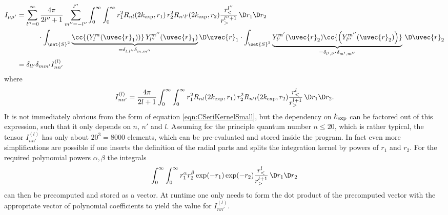 \begin{equation}
\begin{aligned}
	I_{\mu\mu'}
	&= \sum_{l''=0}^{\infty}\frac{4\pi}{2l''+1}
	\sum_{m''=-l''}^{l''}
	\int_0^\infty \int_0^\infty
	r_1^2 R_{nl}(2\kexp,r_1) \, r_2^2 R_{n'l'}(2\kexp,r_2) \frac{r^{l''}_<}{r_>^{l'' + 1}}
	\, \D r_1  \D r_2 \\
	&\hspace{30pt}
	\cdot \int_{\set{S}^2}
		\underbrace{\cc{\left(Y_l^m(\uvec{r}_1)\right)} \, Y_{l''}^{m''}(\uvec{r}_1)}
		_{=\delta_{l,l''}\delta_{m,m''}}
		\D \uvec{r}_1
	\cdot \int_{\set{S}^2}
		\underbrace{Y_{l'}^{m'}(\uvec{r}_2) \cc{\left(Y_{l''}^{m''}(\uvec{r}_2)\right)}}
		_{=\delta_{l',l''}\delta_{m',m''}}
		\, \D \uvec{r}_2 \\
	&= \delta_{ll'} \delta_{mm'} I^{(l)}_{nn'}
\end{aligned}
\label{eqn:CSeriKernel}
\end{equation}
where
\begin{equation}
	I^{(l)}_{nn'}
	= \frac{4\pi}{2l+1}
	\int_0^\infty \int_0^\infty
	r_1^2 R_{nl}(2\kexp,r_1) \, r_2^2 R_{n'l}(2\kexp,r_2) \frac{r^{l}_<}{r_>^{l + 1}}
	\, \D r_1  \D r_2.
	\label{eqn:CSeriKernelSmall}
\end{equation}
It is not immediately obvious from the form of equation \eqref{eqn:CSeriKernelSmall},
but the dependency on $k_\text{exp}$ can be factored out of this expression,
such that it only depends on $n$, $n'$ and $l$.
Assuming for the principle quantum number $n \leq 20$, which is rather typical,
the tensor $I^{(l)}_{nn'}$ has only about $20^3 = 8000$ elements,
which can be pre-evaluated and stored inside the program.
In fact even more simplifications are possible if one inserts
the definition of the radial parts and splits the integration kernel by powers of
$r_1$ and $r_2$.
For the required polynomial powers $\alpha, \beta$ the integrals
\[ \int_0^\infty \int_0^\infty r_1^\alpha r_2^\beta \exp(-r_1) \exp(-r_2)
	\frac{r^{l}_<}{r_>^{l + 1}} \, \D r_1  \D r_2 \]
can then be precomputed and stored as a vector.
At runtime one only needs to form the dot product of the precomputed vector
with the appropriate vector of polynomial coefficients
to yield the value for $I^{(l)}_{nn'}$.

